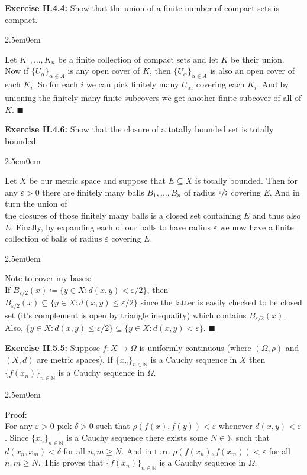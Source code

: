 \documentclass{book}
\newcommand{\HexOne}{%
   \color{Purple}%
   \fontsize{12}{13}\selectfont%
}
\newcommand{\HexPPP}{%
   \color{VioletRed}%
   \fontsize{11}{12}\selectfont%
}
\newenvironment{myIndent}{%
   \begin{adjustwidth}{2.5em}{0em}%
}{%
   \end{adjustwidth}%
}
\newcommand{\blab}[1]{\textbf{#1}}
\newcommand{\retTwo}{\hfill\bigbreak}
\begin{document}
\blab{Exercise II.4.4:} Show that the union of a finite number of compact sets is compact. 

\begin{myIndent}\HexOne
	Let $K_1, \ldots, K_n$ be a finite collection of compact sets and let $K$ be their union. Now if $\{U_\alpha\}_{\alpha \in A}$ is any open cover of $K$, then $\{U_\alpha\}_{\alpha \in A}$ is also an open cover of each $K_i$. So for each $i$ we can pick finitely many $U_{\alpha_j}$ covering each $K_i$. And by unioning the finitely many finite subcovers we get another finite subcover of all of $K$. $\blacksquare$\retTwo
\end{myIndent}

\blab{Exercise II.4.6:} Show that the closure of a totally bounded set is totally bounded.
\begin{myIndent}\HexOne
	Let $X$ be our metric space and suppose that $E \subseteq X$ is totally bounded. Then for any $\varepsilon > 0$ there are finitely many balls $B_1, \ldots, B_n$ of radius $\sfrac{\varepsilon}{2}$ covering $E$. And in turn the union of\\ [-1pt] the closures of those finitely many balls is a closed set containing $E$ and thus also $\overline{E}$. Finally, by expanding each of our balls to have radius $\varepsilon$ we now have a finite collection of balls of radius $\varepsilon$ covering $\overline{E}$.

	\begin{myIndent}\HexPPP
		Note to cover my bases:\\
		If $B_{\varepsilon/2}(x) \coloneqq \{y \in X : d(x, y) < \varepsilon/2\}$, then $\overline{B_{\varepsilon/2}(x)} \subseteq \{y \in X : d(x, y) \leq \varepsilon/2\}$ since the latter is easily checked to be closed set (it's complement is open by triangle inequality) which contains $B_{\varepsilon/2}(x)$. Also, $\{y \in X : d(x, y) \leq \varepsilon/2\} \subseteq \{y \in X : d(x, y) < \varepsilon\}$. $\blacksquare$\retTwo
	\end{myIndent}
\end{myIndent}

\blab{Exercise II.5.5:} Suppose $f: X \to \Omega$ is uniformly continuous (where $(\Omega, \rho)$ and $(X, d)$ are metric spaces). If $\{x_n\}_{n \in \mathbb{N}}$ is a Cauchy sequence in $X$ then $\{f(x_n)\}_{n \in \mathbb{N}}$ is a Cauchy sequence in $\Omega$.

\begin{myIndent}\HexOne
	Proof:\\
	For any $\varepsilon > 0$ pick $\delta > 0$ such that $\rho(f(x), f(y)) < \varepsilon$ whenever $d(x, y) < \varepsilon$. Since $\{x_n\}_{n \in \mathbb{N}}$ is a Cauchy sequence there exists some $N \in \mathbb{N}$ such that $d(x_n, x_m) < \delta$ for all $n, m \geq N$. And in turn $\rho(f(x_n), f(x_m)) < \varepsilon$ for all $n, m \geq N$. This proves that $\{f(x_n)\}_{n \in \mathbb{N}}$ is a Cauchy sequence in $\Omega$.\retTwo
\end{myIndent}
\end{document}
